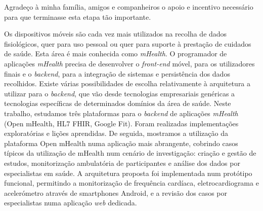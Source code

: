 \documentclass[11pt,twoside,a4paper]{report}
\begin{document}
\TitlePage
  \vspace*{55mm}
       {Agradeço à minha família, amigos e companheiros o apoio e incentivo necessário para que terminasse esta etapa tão importante.}
\EndTitlePage
\titlepage\ \endtitlepage %

\TitlePage
  \vspace*{55mm}
       {Os dispositivos móveis são cada vez mais utilizados na recolha de dados fisiológicos, quer para uso pessoal ou quer para suporte à prestação de cuidados de saúde. Esta área é mais conhecida como \textit{mHealth}. O programador de aplicações \textit{mHealth} precisa de desenvolver o \textit{front-end} móvel, para os utilizadores finais e o \textit{backend}, para a integração de sistemas e persistência dos dados recolhidos. Existe várias possibilidades de escolha relativamente à arquitetura a utilizar para o \textit{backend}, que vão desde tecnologias empresariais genéricas a tecnologias específicas de determinados domínios da área de saúde. Neste trabalho, estudamos três plataformas para o \textit{backend} de aplicações \textit{mHealth} (Open mHealth, HL7 FHIR, Google Fit). Foram realizadas implementações exploratórias e lições aprendidas.}
    \TEXT{}
       {De seguida, mostramos a utilização da plataforma Open mHealth numa aplicação mais abrangente, cobrindo casos típicos da utilização de mHealth num cenário de investigação: criação e gestão de estudos, monitorização ambulatória de participantes e análise dos dados por especialistas em saúde. A arquitetura proposta foi implementada num protótipo funcional, permitindo a monitorização de frequência cardíaca, eletrocardiograma e acelerómetro através de smartphones Android, e a revisão dos casos por especialistas numa aplicação \textit{web} dedicada.   
       }
\EndTitlePage
\titlepage\ \endtitlepage %
\end{document}
